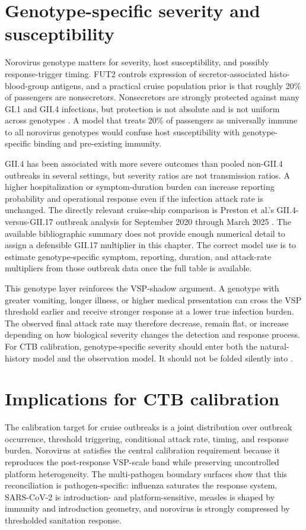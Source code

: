 \section{Genotype-specific severity and susceptibility}
Norovirus genotype matters for severity, host susceptibility, and possibly response-trigger timing. FUT2 controls
expression of secretor-associated histo-blood-group antigens, and a practical cruise population prior is that
roughly 20\% of passengers are nonsecretors. Nonsecretors are strongly protected against many GI.1 and GII.4
infections, but protection is not absolute and is not uniform across genotypes \citep{Karst2010Pathogenesis}. A
model that treats 20\% of passengers as universally immune to all norovirus genotypes would confuse host
susceptibility with genotype-specific binding and pre-existing immunity.

GII.4 has been associated with more severe outcomes than pooled non-GII.4 outbreaks in several settings, but
severity ratios are not transmission ratios. A higher hospitalization or symptom-duration burden can increase
reporting probability and operational response even if the infection attack rate is unchanged. The directly
relevant cruise-ship comparison is Preston et al.'s GII.4-versus-GII.17 outbreak analysis for September 2020
through March 2025 \citep{Preston2026Genotypes}. The available bibliographic summary does not provide enough
numerical detail to assign a defensible GII.17 multiplier in this chapter. The correct model use is to estimate
genotype-specific symptom, reporting, duration, and attack-rate multipliers from those outbreak data once the full
table is available.

This genotype layer reinforces the VSP-shadow argument. A genotype with greater vomiting, longer illness, or higher
medical presentation can cross the VSP threshold earlier and receive stronger response at a lower true infection
burden. The observed final attack rate may therefore decrease, remain flat, or increase depending on how biological
severity changes the detection and response process. For CTB calibration, genotype-specific severity should enter
both the natural-history model and the observation model. It should not be folded silently into \doseadj{}.

\section{Implications for CTB calibration}
The calibration target for cruise outbreaks is a joint distribution over outbreak occurrence, threshold triggering,
conditional attack rate, timing, and response burden. Norovirus at  satisfies the central calibration
requirement because it reproduces the post-response VSP-scale band while preserving uncontrolled platform
heterogeneity. The multi-pathogen boundary surfaces show that this reconciliation is pathogen-specific: influenza
saturates the response system, SARS-CoV-2 is introduction- and platform-sensitive, measles is shaped by immunity
and introduction geometry, and norovirus is strongly compressed by thresholded sanitation response.

